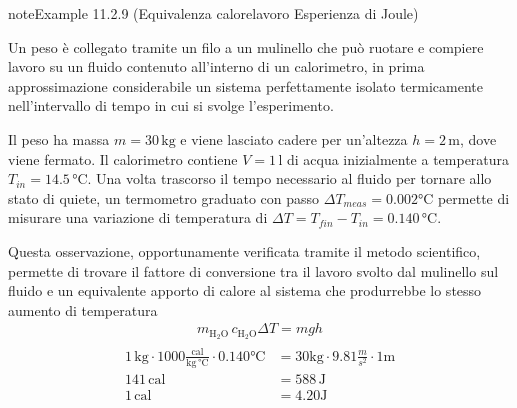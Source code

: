 \documentclass[letterpaper,10pt,italian]{jupyterBook}
\begin{document}
\begin{sphinxadmonition}{note}{Example 11.2.9 (Equivalenza calore\sphinxhyphen{}lavoro \sphinxhyphen{} Esperienza di Joule)}



\sphinxAtStartPar
Un peso è collegato tramite un filo a un mulinello che può ruotare e compiere lavoro su un fluido contenuto all’interno di un calorimetro, in prima approssimazione considerabile un sistema perfettamente isolato termicamente nell’intervallo di tempo in cui si svolge l’esperimento.

\sphinxAtStartPar
Il peso ha massa \(m = 30 \, \text{kg}\) e viene lasciato cadere per un’altezza \(h = 2 \, \text{m}\), dove viene fermato. Il calorimetro contiene \(V = 1 \, \text{l}\) di acqua inizialmente a temperatura \(T_{in} = 14.5 \, \text{°C}\). Una volta trascorso il tempo necessario al fluido per tornare allo stato di quiete, un termometro graduato con passo \(\Delta T_{meas} = 0.002 \text{°C}\) permette di misurare una variazione di temperatura di \(\Delta T = T_{fin} - T_{in} = 0.140 \, \text{°C}\).

\sphinxAtStartPar
Questa osservazione, opportunamente verificata tramite il metodo scientifico, permette di trovare il fattore di conversione tra il lavoro svolto dal mulinello sul fluido e un equivalente apporto di calore al sistema che produrrebbe lo stesso aumento di temperatura
\begin{equation*}
\begin{split}m_{\text{H$_2$O}} \, c_{\text{H$_2$O}} \Delta T = m g h\end{split}
\end{equation*}\begin{equation*}
\begin{split}\begin{aligned}
  1 \, \text{kg} \cdot 1000 \frac{\text{cal}}{\text{kg} \, \text{°C}} \cdot 0.140 \text{°C} & = 30 \text{kg} \cdot 9.81 \frac{m}{s^2} \cdot 1 \text{m} \\
  141 \, \text{cal} & = 588 \, \text{J} \\
  1 \, \text{cal} & = 4.20 \text{J}
\end{aligned}\end{split}
\end{equation*}\end{sphinxadmonition}
\label{ch/thermodynamics/foundation-experiments:example-10}
\end{document}
